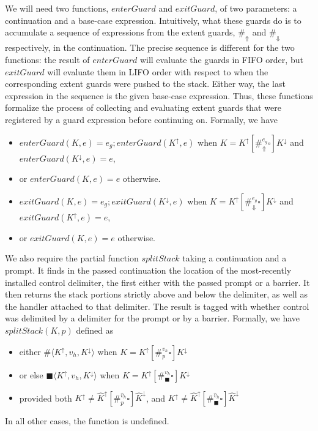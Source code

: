 \documentclass[11pt]{article}
\newcommand{\angles}[1]{\langle#1\rangle}
\begin{document}
We will need two functions, $enterGuard$ and $exitGuard$, of two parameters: a continuation and a base-case expression.
Intuitively, what these guards do is to accumulate a sequence of expressions from the extent guards, $\#_\Uparrow$ and $\#_\Downarrow$ respectively, in the continuation.
The precise sequence is different for the two functions: the result of $enterGuard$ will evaluate the guards in FIFO order, but $exitGuard$ will evaluate them in LIFO order with respect to when the corresponding extent guards were pushed to the stack.
Either way, the last expression in the sequence is the given base-case expression.
Thus, these functions formalize the process of collecting and evaluating extent guards that were registered by a guard expression before continuing on.
Formally, we have
\begin{itemize}
\item $enterGuard(K, e) = e_g;enterGuard(K^\uparrow, e)$ when $K = K^\uparrow[\#_\Uparrow^{e_g}\square]K^\downarrow$ and $enterGuard(K^\downarrow, e) = e$,
\item or $enterGuard(K, e) = e$ otherwise.
\item $exitGuard(K, e) = e_g;exitGuard(K^\downarrow, e)$ when $K = K^\uparrow[\#_\Downarrow^{e_g}\square]K^\downarrow$ and $exitGuard(K^\uparrow, e) = e$,
\item or $exitGuard(K, e) = e$ otherwise.
\end{itemize}


We also require the partial function $splitStack$ taking a continuation and a prompt.
It finds in the passed continuation the location of the most-recently installed control delimiter, the first either with the passed prompt or a barrier.
It then returns the stack portions strictly above and below the delimiter, as well as the handler attached to that delimiter.
The result is tagged with whether control was delimited by a delimiter for the prompt or by a barrier.
Formally, we have $splitStack(K, p)$ defined as
\begin{itemize}
\item either $\#\angles{K^\uparrow, v_h, K^\downarrow}$
      when $K = K^\uparrow[\#_p^{v_h}\square]K^\downarrow$
\item or else $\blacksquare\angles{K^\uparrow, v_h, K^\downarrow}$
      when $K = K^\uparrow[\#_\blacksquare^{v_h}\square]K^\downarrow$
\item provided both $K^\uparrow \neq \hat{K}^\uparrow[\#_p^{\hat{v}_h}\square]\hat{K}^\downarrow$, and $K^\uparrow \neq \hat{K}^\uparrow[\#_\blacksquare^{\hat{v}_h}\square]\hat{K}^\downarrow$
\end{itemize}
In all other cases, the function is undefined.
\end{document}
